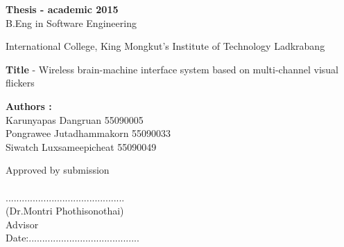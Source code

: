 \begin{approve}
\textbf{Thesis - academic 2015}\\
B.Eng in Software Engineering

International College, King Mongkut's Institute of Technology Ladkrabang


\textbf{Title} - Wireless brain-machine interface system based on multi-channel visual flickers

\textbf{Authors :}\\
Karunyapas  Dangruan  55090005\\
Pongrawee  Jutadhammakorn 55090033\\
Siwatch  Luxsameepicheat  55090049\\

\begin{flushright}
Approved by submission\\\\
............................................\\
(Dr.Montri Phothisonothai)\\
Advisor\\

Date:.........................................\\
\end{flushright}



\end{approve}